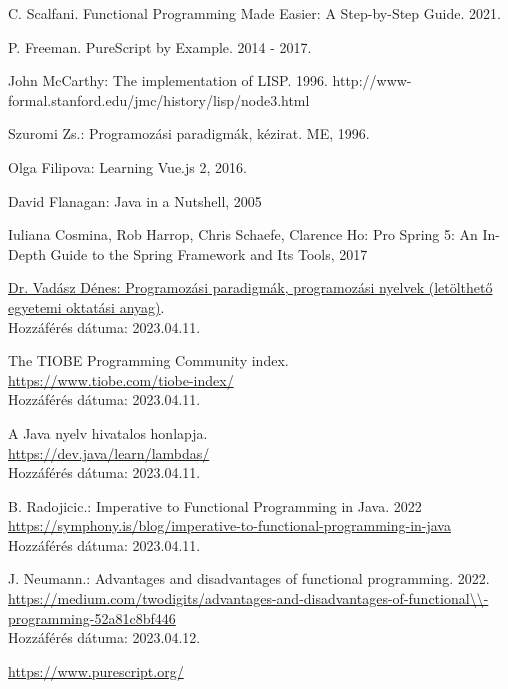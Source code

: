 \documentclass[12pt]{article}
\begin{document}
\begin{thebibliography}{99}

C. Scalfani. Functional Programming Made Easier: A Step-by-Step Guide. 2021.

P. Freeman. PureScript by Example. 2014 - 2017.

John McCarthy: The implementation of LISP. 1996.
http://www-formal.stanford.edu/jmc/history/lisp/node3.html

Szuromi Zs.: Programozási paradigmák, kézirat. ME, 1996.

Olga Filipova: Learning Vue.js 2, 2016.

David Flanagan: Java in a Nutshell, 2005

Iuliana Cosmina, Rob Harrop, Chris Schaefe, Clarence Ho: Pro Spring 5: An In-Depth Guide to the Spring Framework and Its Tools, 2017

\href{https://web.archive.org/web/20150501083657/http://www.iit.uni-miskolc.hu/iitweb/export/sites/default/users/DVadasz/GEIAL401/Progpar-4-fejezet.pdf#}{Dr. Vadász Dénes: Programozási paradigmák, programozási nyelvek (letölthető egyetemi oktatási anyag)}.\\ Hozzáférés dátuma: 2023.04.11.

The TIOBE Programming Community index. \\ \url{https://www.tiobe.com/tiobe-index/} \\Hozzáférés dátuma: 2023.04.11.

A Java nyelv hivatalos honlapja. \\ \url{https://dev.java/learn/lambdas/}  \\Hozzáférés dátuma: 2023.04.11.

B. Radojicic.: Imperative to Functional Programming in Java. 2022\\
\url{https://symphony.is/blog/imperative-to-functional-programming-in-java} \\Hozzáférés dátuma: 2023.04.11.

J. Neumann.: Advantages and disadvantages of functional programming. 2022.\\
\url{https://medium.com/twodigits/advantages-and-disadvantages-of-functional\\-programming-52a81c8bf446}\\
Hozzáférés dátuma: 2023.04.12.

\url{https://www.purescript.org/}


\end{thebibliography}
\end{document}
